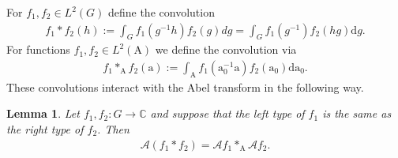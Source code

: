 \documentclass[12pt]{amsart}
\newtheorem{lemma}[theorem]{Lemma}
\theoremstyle{definition}
\theoremstyle{remark}
\numberwithin{equation}{section}
\newcommand{\C}{{\mathbb C}}
\newcommand{\1}{{\mathbf 1}}
\renewcommand{\d}{\mathrm d}
\begin{document}
For $f_1,f_2 \in L^2(G)$ define the convolution
\begin{align*}
    f_1 \ast f_2 (h) := \int_G f_1( g^{-1} h) f_2 ( g ) dg =  \int_G f_1(g^{-1} ) f_2 (h g ) \d g .
\end{align*}
For functions  $f_1,f_2 \in L^2(\mathrm{A})$ we define the convolution via
\begin{align*}
   f_1 \ast_{\mathrm{A}} f_2 (\mathrm{a}) := \int_{\mathrm{A}} f_1(\mathrm{a}_0^{-1} \mathrm{a}) f_2(\mathrm{a}_0)  \d \mathrm{a}_0.
\end{align*}
These convolutions interact with the Abel transform in the following way.
\begin{lemma} \label{le:abelconvo}
Let $f_1,f_2:G\to\C$ and suppose that the left type of $f_1$ is the same as the right type of $f_2$.   Then
    \begin{align*}
        \mathcal{A}(   f_1 \ast f_2 ) =     \mathcal{A} f_1 \ast_{\mathrm{A}} \mathcal{A} f_2.
    \end{align*}
\end{lemma}
\end{document}
